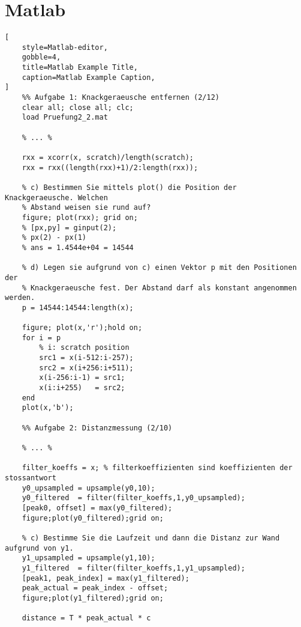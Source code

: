 \documentclass[a4paper,11pt,oneside,showtrims]{alpenthesis}
\begin{document}
\thelstlisting
{}
\thelstlisting

\thelisting
{}
\thelisting

\tikzexternaldisable
\begin{tcolorbox}[title=test]
    \lipsum[2]
\end{tcolorbox}
\tikzexternalenable

\tikzexternaldisable
\begin{tcolorbox}
    \lipsum[2]
\end{tcolorbox}
\tikzexternalenable

\section{Matlab}

\begin{lstlisting}[
    style=Matlab-editor,
    gobble=4,
    title=Matlab Example Title,
    caption=Matlab Example Caption,
]
    %% Aufgabe 1: Knackgeraeusche entfernen (2/12)
    clear all; close all; clc;
    load Pruefung2_2.mat

    % ... %

    rxx = xcorr(x, scratch)/length(scratch);
    rxx = rxx((length(rxx)+1)/2:length(rxx));

    % c) Bestimmen Sie mittels plot() die Position der Knackgeraeusche. Welchen
    % Abstand weisen sie rund auf?
    figure; plot(rxx); grid on;
    % [px,py] = ginput(2);
    % px(2) - px(1)
    % ans = 1.4544e+04 = 14544

    % d) Legen sie aufgrund von c) einen Vektor p mit den Positionen der
    % Knackgeraeusche fest. Der Abstand darf als konstant angenommen werden.
    p = 14544:14544:length(x);

    figure; plot(x,'r');hold on;
    for i = p
        % i: scratch position
        src1 = x(i-512:i-257);
        src2 = x(i+256:i+511);
        x(i-256:i-1) = src1;
        x(i:i+255)   = src2;
    end
    plot(x,'b');

    %% Aufgabe 2: Distanzmessung (2/10)

    % ... %

    filter_koeffs = x; % filterkoeffizienten sind koeffizienten der stossantwort
    y0_upsampled = upsample(y0,10);
    y0_filtered  = filter(filter_koeffs,1,y0_upsampled);
    [peak0, offset] = max(y0_filtered);
    figure;plot(y0_filtered);grid on;

    % c) Bestimme Sie die Laufzeit und dann die Distanz zur Wand aufgrund von y1.
    y1_upsampled = upsample(y1,10);
    y1_filtered  = filter(filter_koeffs,1,y1_upsampled);
    [peak1, peak_index] = max(y1_filtered);
    peak_actual = peak_index - offset;
    figure;plot(y1_filtered);grid on;

    distance = T * peak_actual * c
\end{lstlisting}
\end{document}
